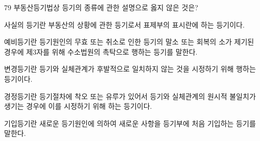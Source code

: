\begin{question}{79}
부동산등기법상 등기의 종류에 관한 설명으로 옳지 않은 것은?
\begin{choices}
  \item 사실의 등기란 부동산의 상황에 관한 등기로서 표제부의 표시란에 하는 등기이다.
  \item 예비등기란 등기원인의 무효 또는 취소로 인한 등기의 말소 또는 회복의 소가 제기된 경우에 제3자를 위해 수소법원의 촉탁으로 행하는 등기를 말한다.
  \item 변경등기란 등기와 실체관계가 후발적으로 일치하지 않는 것을 시정하기 위해 행하는 등기이다.
  \item 경정등기란 등기절차에 착오 또는 유루가 있어서 등기와 실체관계의 원시적 불일치가 생기는 경우에 이를 시정하기 위해 하는 등기이다.
  \item 기입등기란 새로운 등기원인에 의하여 새로운 사항을 등기부에 처음 기입하는 등기를 말한다.
\end{choices}
\end{question}
